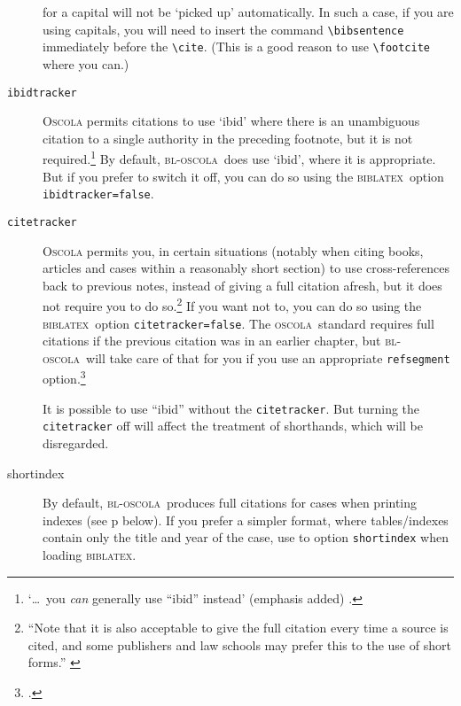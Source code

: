 \documentclass[a4paper,
               11pt,
	       DIV=1,			   
	       footinclude=false]
	      {scrartcl}
\newcommand{\oscola}{\textsc{bl-oscola}}
\newcommand{\biblatex}{\textsc{biblatex}}
\newcommand{\oscolashort}{\textsc{oscola}\nocite{oscola}}
\begin{document}
\begin{description}
  for a capital will not be `picked up' automatically. In such a case,
  if you are using capitals, you will need to insert the command
  \verb|\bibsentence| immediately before the \verb|\cite|. (This is a
  good reason to use \verb|\footcite| where you can.\label{ibidstyle})
\item[\texttt{ibidtracker}] 
   \textsc{Oscola} permits
  citations to use `ibid' where there is an unambiguous citation to a
  single authority in the preceding footnote, but it is not
  required.\footnote{`\ldots\ you \emph{can} generally use ``ibid''
    instead' (emphasis added) \cite[5]{oscola}.} By default,
  \oscola\ does use `ibid', where it is appropriate. But if you prefer
  to switch it off, you can do so using the \biblatex\ option
  \texttt{ibidtracker=false}.
\item[\texttt{citetracker}]
                  \textsc{Oscola} permits you, in certain situations (notably
  when citing books, articles and cases within a reasonably short
  section) to use cross-references back to previous notes, instead of
  giving a full citation afresh, but it does not require you to do
  so.\footnote{\enquote{Note that it is also acceptable to give the
      full citation every time a source is cited, and some publishers
      and law schools may prefer this to the use of short forms.}
    \cite[5]{oscola}} If you want not to, you can do so using the
  \biblatex\ option \texttt{citetracker={}false}. The \oscolashort\
  standard requires full citations if the previous citation was
  in an earlier chapter, but \oscola\ will take care of that for
  you if you use an appropriate \texttt{refsegment} option.\footcite[57]{biblatex2}

It is possible to use \enquote{ibid} without the
\verb|citetracker|. But turning the \verb|citetracker| off will affect
the treatment of shorthands, which will be disregarded.
\item[shortindex] By default, \oscola\ produces full citations for
  cases when printing indexes (see p \pageref{index:format} below). If
  you prefer a simpler format, where tables\slash indexes contain only
  the title and year of the case, use to option \texttt{shortindex}
  when loading \biblatex.
\end{description}
\end{document}
